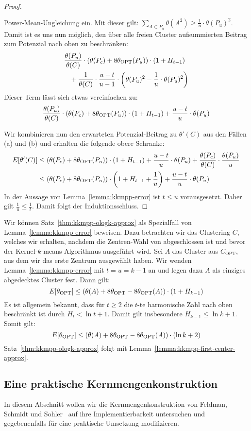 \begin{proof}
\begin{enumerate}
					Power-Mean-Ungleichung ein. Mit dieser gilt:
					$ \sum_{A \subset P_u} \theta(A^2) \geq \frac{1}{u} \cdot \theta(P_u)^2 $.
					Damit ist es uns nun möglich, den über alle freien Cluster aufsummierten Beitrag zum Potenzial
					nach oben zu beschränken:
					\begin{align*}
						&\frac{\theta(P_u)}{\theta(C)} \cdot \left( \theta(P_c) + 8 \theta_{\textrm{OPT}}(P_u) \right) \cdot (1 + H_{t-1}) \\
						& \; \; \; + \frac{1}{\theta(C)} \cdot \frac{u-t}{u-1} \cdot \left( 
						\theta(P_u)^2 - \frac{1}{u} \cdot \theta(P_u)^2 \right)
					\end{align*}
					Dieser Term lässt sich etwas vereinfachen zu:
					\[ \frac{\theta(P_u)}{\theta(C)} \cdot \left( \theta(P_c) + 8 \theta_{\textrm{OPT}}(P_u) \right) \cdot (1 + H_{t-1})
						+ \frac{u-t}{u} \cdot \theta(P_u) \]
	\end{enumerate}
	Wir kombinieren nun den erwarteten Potenzial-Beitrag zu $\theta'(C)$ aus den Fällen (a) und (b) und erhalten die folgende
	obere Schranke:
	\begin{align*}
		E[\theta'(C)] &\leq \left( \theta(P_c) + 8 \theta_{\textrm{OPT}}(P_u) \right) \cdot (1 + H_{t-1})
			+ \frac{u-t}{u} \cdot \theta(P_u) + \frac{\theta(P_c)}{\theta(C)} \cdot \frac{\theta(P_u)}{u} \\
			&\leq \left( \theta(P_c) + 8 \theta_{\textrm{OPT}}(P_u) \right) \cdot \left( 1 + H_{t-1} + \frac{1}{u} \right)
				+ \frac{u-t}{u} \cdot \theta(P_u)
	\end{align*}
	In der Aussage von Lemma~\ref{lemma:kkmpp-error} ist $t \leq u$ vorausgesetzt. Daher gilt $\frac{1}{u} \leq \frac{1}{t}$.
	Damit folgt der Induktionsschluss.
\end{proof}
Wir können Satz~\ref{thm:kkmpp-ologk-approx} als Spezialfall von Lemma~\ref{lemma:kkmpp-error} beweisen. Dazu betrachten wir
das Clustering $C$, welches wir erhalten, nachdem die Zentren-Wahl von \kkmpp{} abgeschlossen ist und bevor der Kernel-$k$-means
Algorithmus ausgeführt wird. Sei $A$ das Cluster aus $C_\textrm{OPT}$, aus dem wir das erste Zentrum ausgewählt haben.
Wir wenden Lemma~\ref{lemma:kkmpp-error} mit $t = u = k-1$ an und legen dazu $A$ als einziges abgedecktes Cluster fest.
Dann gilt:
\[ E[\theta_{\textrm{OPT}}] \leq \left( \theta(A) + 8 \theta_{\textrm{OPT}} - 8 \theta_{\textrm{OPT}}(A) \right) \cdot (1 + H_{k-1}) \]
Es ist allgemein bekannt, dass für $t \geq 2$ die $t$-te harmonische Zahl nach oben beschränkt ist durch $H_t < \ln{t} + 1$.
Damit gilt insbesondere $H_{k-1} \leq \ln{k} + 1$. Somit gilt:
\[ E[\theta_{\textrm{OPT}}] \leq \left( \theta(A) + 8 \theta_{\textrm{OPT}} - 8 \theta_{\textrm{OPT}}(A) \right) \cdot (\ln{k} + 2) \]
Satz~\ref{thm:kkmpp-ologk-approx} folgt mit Lemma~\ref{lemma:kkmpp-first-center-approx}.

\subsection{Eine praktische Kernmengenkonstruktion}

In diesem Abschnitt wollen wir die Kernmengenkonstruktion von Feldman, Schmidt und Sohler~\cite{FeldmanSS13,Schmidt14} auf ihre
Implementierbarkeit untersuchen und gegebenenfalls für eine praktische Umsetzung modifizieren.